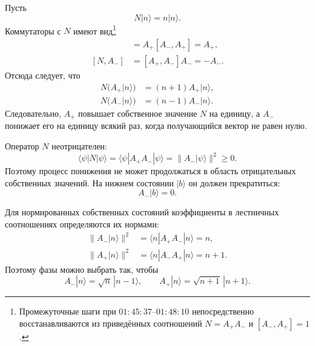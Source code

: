 Пусть
\begin{equation}
N|n\rangle=n|n\rangle.
\end{equation}
Коммутаторы с \(N\) имеют вид\footnote{Промежуточные шаги при \(01{:}45{:}37\)--\(01{:}48{:}10\) непосредственно восстанавливаются из приведённых соотношений \(N=A_+A_-\) и \([A_-,A_+]=1\).}
\begin{align}
[N,A_+]
&=A_+[A_-,A_+]=A_+, \\
[N,A_-]
&=[A_+,A_-]A_-=-A_-.
\end{align}
Отсюда следует, что
\begin{align}
N\bigl(A_+|n\rangle\bigr)
&=(n+1)A_+|n\rangle, \\
N\bigl(A_-|n\rangle\bigr)
&=(n-1)A_-|n\rangle.
\end{align}
Следовательно, \(A_+\) повышает собственное значение \(N\) на единицу, а \(A_-\) понижает его на единицу всякий раз, когда получающийся вектор не равен нулю.

Оператор \(N\) неотрицателен:
\begin{equation}
\langle\psi|N|\psi\rangle
=\langle\psi|A_+A_-|\psi\rangle
=\|A_-|\psi\rangle\|^2
\geq0.
\end{equation}
Поэтому процесс понижения не может продолжаться в область отрицательных собственных значений. На нижнем состоянии \(|b\rangle\) он должен прекратиться:
\begin{equation}
A_-|b\rangle=0.
\end{equation}

Для нормированных собственных состояний коэффициенты в лестничных соотношениях определяются их нормами:
\begin{align}
\|A_-|n\rangle\|^2
&=\langle n|A_+A_-|n\rangle=n, \\
\|A_+|n\rangle\|^2
&=\langle n|A_-A_+|n\rangle=n+1.
\end{align}
Поэтому фазы можно выбрать так, чтобы
\begin{equation}
A_-|n\rangle=\sqrt{n}\,|n-1\rangle,
\qquad
A_+|n\rangle=\sqrt{n+1}\,|n+1\rangle.
\end{equation}

\begin{classroomqa}
\end{classroomqa}


